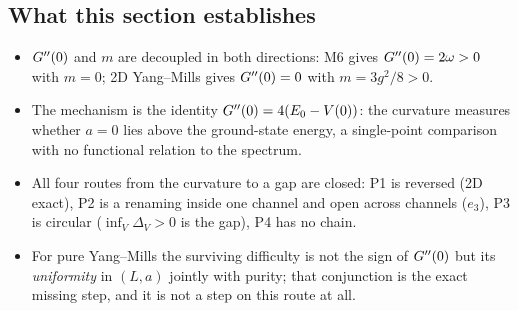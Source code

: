 \subsection{What this section establishes}

\begin{itemize}
\item \LT{} $G''(0)$ and $m$ are decoupled in both directions: M6 gives $G''(0)=2\omega>0$ with $m=0$;
      2D Yang--Mills gives $G''(0)=0$ with $m=3g^{2}/8>0$.
\item \LT{} The mechanism is the identity $G''(0)=4(E_0-V(0))$: the curvature measures whether
      $a=0$ lies above the ground-state energy, a single-point comparison with no functional
      relation to the spectrum.
\item \LN{} All four routes from the curvature to a gap are closed: P1 is reversed (2D exact),
      P2 is a renaming inside one channel and open across channels ($e_3$), P3 is circular
      ($\inf_V\Delta_V>0$ is the gap), P4 has no chain.
\item \LM{} For pure Yang--Mills the surviving difficulty is not the sign of $G''(0)$ but its
      \emph{uniformity} in $(L,a)$ jointly with purity; that conjunction is the exact missing
      step, and it is not a step on this route at all.
\end{itemize}
